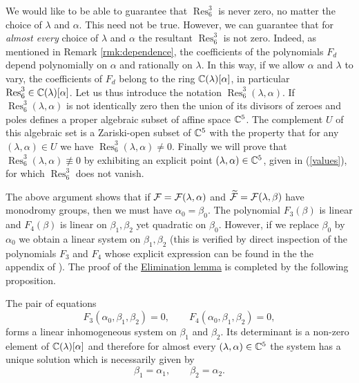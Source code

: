 We would like to be able to guarantee that $\operatorname{Res}^3_6$ is never zero, no matter the choice of $\lambda$ and $\alpha$. This need not be true. However, we can guarantee that for \emph{almost every} choice of $\lambda$ and $\alpha$ the resultant $\operatorname{Res}^3_6$ is not zero. Indeed, as mentioned in Remark \ref{rmk:dependence}, the coefficients of the polynomials $F_d$ depend polynomially on $\alpha$ and rationally on $\lambda$. In this way, if we allow $\alpha$ and $\lambda$ to vary, the coefficients of $F_d$ belong to the ring $\mathbb{C}(\lambda)[\alpha]$, in particular $\operatorname{Res}^3_6\in\mathbb{C}(\lambda)[\alpha]$. Let us thus introduce the notation $\operatorname{Res}^3_6(\lambda,\alpha)$. If $\operatorname{Res}^3_6(\lambda,\alpha)$ is not identically zero then the union of its divisors of zeroes and poles defines a proper algebraic subset of affine space $\mathbb{C}^5$. The complement $U$ of this algebraic set is a Zariski-open subset of $\mathbb{C}^5$ with the property that for any $(\lambda,\alpha)\in U$ we have $\operatorname{Res}^3_6(\lambda,\alpha)\neq 0$. Finally we will prove that $\operatorname{Res}^3_6(\lambda,\alpha)\not\equiv 0$ by exhibiting an explicit point $(\lambda,\alpha)\in\mathbb{C}^5$, given in (\ref{values}), for which $\operatorname{Res}^3_6$ does not vanish. 

The above argument shows that if $\mathcal{F}=\mathcal{F}(\lambda,\alpha)$ and $\widetilde{\mathcal{F}}=\mathcal{F}(\lambda,\beta)$ have  monodromy groups, then we must have $\alpha_0=\beta_0$. The polynomial $F_3(\beta)$ is linear and $F_4(\beta)$ is linear on $\beta_1,\beta_2$ yet quadratic on $\beta_0$. However, if we replace $\beta_0$ by $\alpha_0$ we obtain a linear system on $\beta_1,\beta_2$ (this is verified by direct inspection of the polynomials $F_3$ and $F_4$ whose explicit expression can be found in the the appendix of \cite{arXivVersion}). The proof of the \hyperref[lemma:elimination]{Elimination lemma} is completed by the following proposition.

\begin{proposition}\label{prop:elimination2}
The pair of equations
\begin{equation}\label{eq:elimination2}
F_3(\alpha_0,\beta_1,\beta_2)=0,\qquad F_4(\alpha_0,\beta_1,\beta_2)=0,
\end{equation}
forms a linear inhomogeneous system on $\beta_1$ and $\beta_2$. Its determinant is a non-zero element of $\mathbb{C}(\lambda)[\alpha]$ and therefore for almost every $(\lambda,\alpha)\in\mathbb{C}^5$ the system has a unique solution which is necessarily given by 
\[ \beta_1=\alpha_1, \qquad \beta_2=\alpha_2. \]
\end{proposition}

